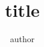 

% 

\title[shorttitle]{title}

\author{author}


\date{}



\fontsize{10pt}{14pt}\selectfont

\begin{frame}
	\titlepage
\end{frame}

